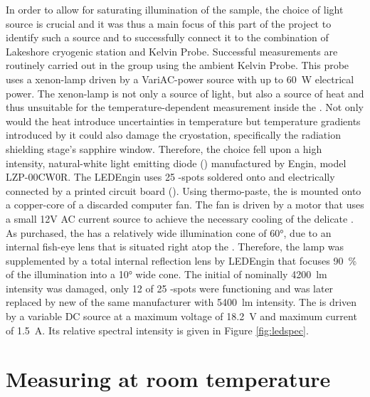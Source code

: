 In order to allow for saturating illumination of the sample, the choice of light source is crucial and it was thus a main focus of this part of the project to identify such a source and to successfully connect it to the combination of Lakeshore cryogenic station and \McA{} Kelvin Probe. Successful \spv{} measurements are routinely carried out in the group using the ambient Kelvin Probe. This probe uses a xenon-lamp driven by a VariAC-power source with up to \SI{60}{\watt} electrical power. The xenon-lamp is not only a source of light, but also a source of heat and thus unsuitable for the temperature-dependent measurement inside the \McA{}. Not only would the heat introduce uncertainties in temperature but temperature gradients introduced by it could also damage the cryostation, specifically the radiation shielding stage's sapphire window. Therefore, the choice fell upon a high intensity, natural-white light emitting diode (\led{}) manufactured by \led{} Engin, model LZP-00CW0R. The LEDEngin \led{} uses 25 \led{}-spots soldered onto and electrically connected by a printed circuit board (\pcb{}). Using thermo-paste, the \led{} is mounted onto a copper-core of a discarded computer fan. The fan is driven by a motor that uses a small 12V AC current source to achieve the necessary cooling of the delicate \led{}. As purchased, the \led{} has a relatively wide illumination cone of \ang{60}, due to an internal fish-eye lens that is situated right atop the \pcb{}. Therefore, the lamp was supplemented by a total internal reflection lens by LEDEngin that focuses \SI{90}{\percent} of the illumination into a \ang{10} wide cone. The initial \led{} of nominally \SI{4200}{\lumen} intensity was damaged, only 12 of 25 \led{}-spots were functioning and was later replaced by new \led{} of the same manufacturer with \SI{5400}{\lumen} intensity. The \led{} is driven by a variable DC source at a maximum voltage of \SI{18.2}{\volt} and maximum current of \SI{1.5}{\ampere}. Its relative spectral intensity is given in Figure \ref{fig:ledspec}.

\section{Measuring \cpd{} at room temperature}
